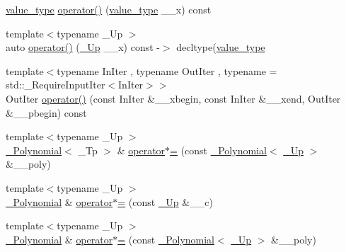 \begin{DoxyCompactItemize}
\item 
\hyperlink{class____gnu__cxx_1_1__Polynomial_a725563351f50e76084a7a016c06f8a53}{value\+\_\+type} \hyperlink{class____gnu__cxx_1_1__Polynomial_a9aa91f3424896c07d51fa09950825549}{operator()} (\hyperlink{class____gnu__cxx_1_1__Polynomial_a725563351f50e76084a7a016c06f8a53}{value\+\_\+type} \+\_\+\+\_\+x) const
\item 
{\footnotesize template$<$typename \+\_\+\+Up $>$ }\\auto \hyperlink{class____gnu__cxx_1_1__Polynomial_a064c220c67f2d72104b3d4767ca5cc42}{operator()} (\hyperlink{class____gnu__cxx_1_1__Polynomial_a242114d4b86648a5dff67a8221f80d40}{\+\_\+\+Up} \+\_\+\+\_\+x) const -\/$>$ decltype(\hyperlink{class____gnu__cxx_1_1__Polynomial_a725563351f50e76084a7a016c06f8a53}{value\+\_\+type}
\item 
{\footnotesize template$<$typename In\+Iter , typename Out\+Iter , typename  = std\+::\+\_\+\+Require\+Input\+Iter$<$\+In\+Iter$>$$>$ }\\Out\+Iter \hyperlink{class____gnu__cxx_1_1__Polynomial_a06d7b0b57d6764da29049b3c2b6f890c}{operator()} (const In\+Iter \&\+\_\+\+\_\+xbegin, const In\+Iter \&\+\_\+\+\_\+xend, Out\+Iter \&\+\_\+\+\_\+pbegin) const
\item 
{\footnotesize template$<$typename \+\_\+\+Up $>$ }\\\hyperlink{class____gnu__cxx_1_1__Polynomial}{\+\_\+\+Polynomial}$<$ \+\_\+\+Tp $>$ \& \hyperlink{class____gnu__cxx_1_1__Polynomial_a5e5dae4944bc0352b6b360f8decd2d07}{operator$\ast$=} (const \hyperlink{class____gnu__cxx_1_1__Polynomial}{\+\_\+\+Polynomial}$<$ \hyperlink{class____gnu__cxx_1_1__Polynomial_a242114d4b86648a5dff67a8221f80d40}{\+\_\+\+Up} $>$ \&\+\_\+\+\_\+poly)
\item 
{\footnotesize template$<$typename \+\_\+\+Up $>$ }\\\hyperlink{class____gnu__cxx_1_1__Polynomial}{\+\_\+\+Polynomial} \& \hyperlink{class____gnu__cxx_1_1__Polynomial_a2797074d43a1746ced73122a0509a1ce}{operator$\ast$=} (const \hyperlink{class____gnu__cxx_1_1__Polynomial_a242114d4b86648a5dff67a8221f80d40}{\+\_\+\+Up} \&\+\_\+\+\_\+c)
\item 
{\footnotesize template$<$typename \+\_\+\+Up $>$ }\\\hyperlink{class____gnu__cxx_1_1__Polynomial}{\+\_\+\+Polynomial} \& \hyperlink{class____gnu__cxx_1_1__Polynomial_ab7daa447472ac775ee38ef0db323bb19}{operator$\ast$=} (const \hyperlink{class____gnu__cxx_1_1__Polynomial}{\+\_\+\+Polynomial}$<$ \hyperlink{class____gnu__cxx_1_1__Polynomial_a242114d4b86648a5dff67a8221f80d40}{\+\_\+\+Up} $>$ \&\+\_\+\+\_\+poly)

\end{DoxyCompactItemize}
